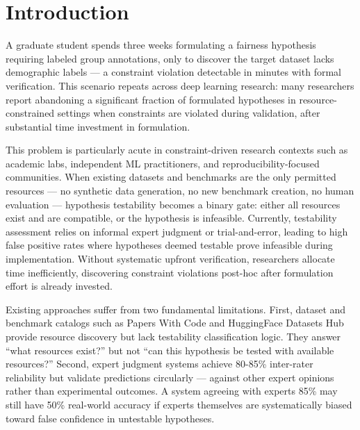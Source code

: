 \section{Introduction}

A graduate student spends three weeks formulating a fairness hypothesis requiring labeled group annotations, only to discover the target dataset lacks demographic labels --- a constraint violation detectable in minutes with formal verification. This scenario repeats across deep learning research: many researchers report abandoning a significant fraction of formulated hypotheses in resource-constrained settings when constraints are violated during validation, after substantial time investment in formulation.

This problem is particularly acute in constraint-driven research contexts such as academic labs, independent ML practitioners, and reproducibility-focused communities. When existing datasets and benchmarks are the only permitted resources --- no synthetic data generation, no new benchmark creation, no human evaluation --- hypothesis testability becomes a binary gate: either all resources exist and are compatible, or the hypothesis is infeasible. Currently, testability assessment relies on informal expert judgment or trial-and-error, leading to high false positive rates where hypotheses deemed testable prove infeasible during implementation. Without systematic upfront verification, researchers allocate time inefficiently, discovering constraint violations post-hoc after formulation effort is already invested.

Existing approaches suffer from two fundamental limitations. First, dataset and benchmark catalogs such as Papers With Code and HuggingFace Datasets Hub provide resource discovery but lack testability classification logic. They answer ``what resources exist?'' but not ``can this hypothesis be tested with available resources?'' Second, expert judgment systems achieve 80-85\% inter-rater reliability but validate predictions circularly --- against other expert opinions rather than experimental outcomes. A system agreeing with experts 85\% may still have 50\% real-world accuracy if experts themselves are systematically biased toward false confidence in untestable hypotheses.

